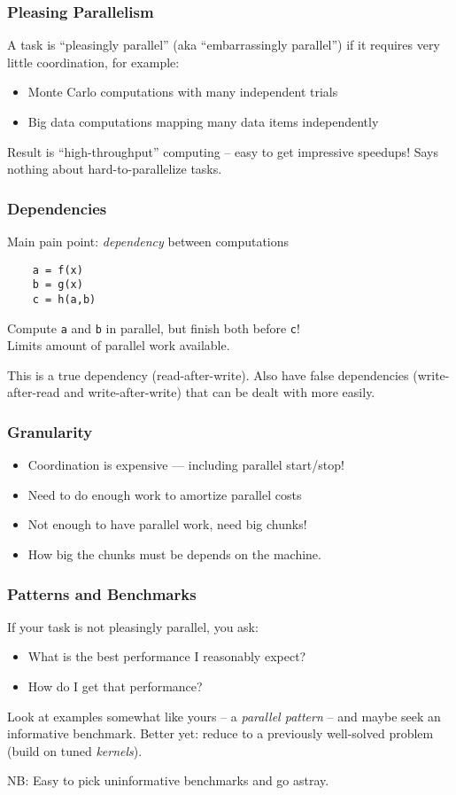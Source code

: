 \documentclass{beamer}
\begin{document}
\begin{frame}
  \frametitle{Pleasing Parallelism}

  A task is ``pleasingly parallel'' (aka ``embarrassingly parallel'')
  if it requires very little coordination, for example:
  \begin{itemize}
  \item Monte Carlo computations with many independent trials
  \item Big data computations mapping many data items independently
  \end{itemize}
  Result is ``high-throughput'' computing -- easy to get impressive
  speedups!  Says nothing about hard-to-parallelize tasks.

\end{frame}


\begin{frame}[fragile]
  \frametitle{Dependencies}

  Main pain point: {\em dependency} between computations
  \begin{lstlisting}
    a = f(x)
    b = g(x)
    c = h(a,b)
  \end{lstlisting}
  Compute {\tt a} and {\tt b} in parallel, but finish both
  before {\tt c}! \\
  Limits amount of parallel work available.

  This is a true dependency (read-after-write).  Also have false
  dependencies (write-after-read and write-after-write) that can be
  dealt with more easily.
\end{frame}


\begin{frame}
  \frametitle{Granularity}

  \begin{itemize}
  \item Coordination is expensive --- including parallel start/stop!
  \item Need to do enough work to amortize parallel costs
  \item Not enough to have parallel work, need big chunks!
  \item How big the chunks must be depends on the machine.
  \end{itemize}
\end{frame}


\begin{frame}
  \frametitle{Patterns and Benchmarks}

  If your task is not pleasingly parallel, you ask:
  \begin{itemize}
  \item What is the best performance I reasonably expect?
  \item How do I get that performance?
  \end{itemize}
  Look at examples somewhat like yours --
  a {\em parallel pattern} -- and maybe seek an informative
  benchmark.  Better yet: reduce to a previously
  well-solved problem (build on tuned {\em kernels}).

  \vspace{1cm}
  NB: Easy to pick uninformative benchmarks and go astray.
\end{frame}
\end{document}
